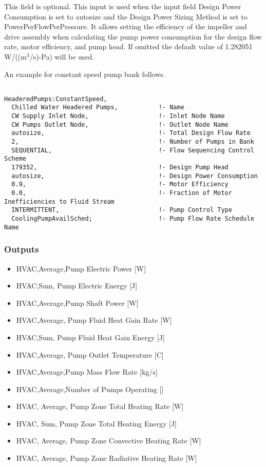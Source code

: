 This field is optional. This input is used when the input field Design Power Consumption is set to autosize and the Design Power Sizing Method is set to PowerPerFlowPerPressure. It allows setting the efficiency of the impeller and drive assembly when calculating the pump power consumption for the design flow rate, motor efficiency, and pump head. If omitted the default value of 1.282051 W/((m\(^{3}\)/s)-Pa) will be used.

An example for constant speed pump bank follows.

\begin{lstlisting}

HeaderedPumps:ConstantSpeed,
  Chilled Water Headered Pumps,           !- Name
  CW Supply Inlet Node,                   !- Inlet Node Name
  CW Pumps Outlet Node,                   !- Outlet Node Name
  autosize,                               !- Total Design Flow Rate
  2,                                      !- Number of Pumps in Bank
  SEQUENTIAL,                             !- Flow Sequencing Control Scheme
  179352,                                 !- Design Pump Head
  autosize,                               !- Design Power Consumption
  0.9,                                    !- Motor Efficiency
  0.0,                                    !- Fraction of Motor Inefficiencies to Fluid Stream
  INTERMITTENT,                           !- Pump Control Type
  CoolingPumpAvailSched;                  !- Pump Flow Rate Schedule Name
\end{lstlisting}

\subsubsection{Outputs}\label{outputs-3-014}

\begin{itemize}
\item
  HVAC,Average,Pump Electric Power {[}W{]}
\item
  HVAC,Sum, Pump Electric Energy {[}J{]}
\item
  HVAC,Average,Pump Shaft Power {[}W{]}
\item
  HVAC,Average, Pump Fluid Heat Gain Rate {[}W{]}
\item
  HVAC,Sum, Pump Fluid Heat Gain Energy {[}J{]}
\item
  HVAC,Average, Pump Outlet Temperature {[}C{]}
\item
  HVAC,Average,Pump Mass Flow Rate {[}kg/s{]}
\item
  HVAC,Average,Number of Pumps Operating {[]}
\item
  HVAC, Average, Pump Zone Total Heating Rate {[}W{]}
\item
  HVAC, Sum, Pump Zone Total Heating Energy {[}J{]}
\item
  HVAC, Average, Pump Zone Convective Heating Rate {[}W{]}
\item
  HVAC, Average, Pump Zone Radiative Heating Rate {[}W{]}
\end{itemize}

